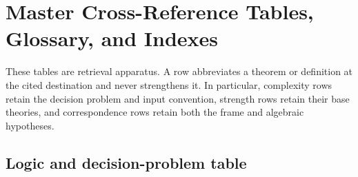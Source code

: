 \chapter{Master Cross-Reference Tables, Glossary, and Indexes}
\label{sec:p14-master-tables}

These tables are retrieval apparatus. A row abbreviates a theorem or definition
at the cited destination and never strengthens it. In particular, complexity
rows retain the decision problem and input convention, strength rows retain
their base theories, and correspondence rows retain both the frame and
algebraic hypotheses.

\section{Logic and decision-problem table}
\label{sec:p14-decision-table}

